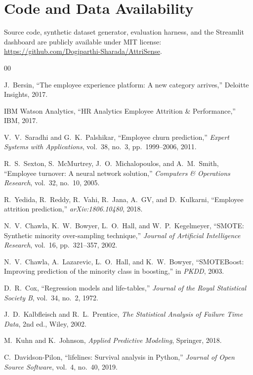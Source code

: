 \documentclass[conference]{IEEEtran}
\begin{document}
\section*{Code and Data Availability}
Source code, synthetic dataset generator, evaluation harness, and
the Streamlit dashboard are publicly available under MIT license:
\url{https://github.com/Dogiparthi-Sharada/AttriSense}.

\begin{thebibliography}{00}

 J.~Bersin, ``The employee experience platform:
A new category arrives,'' Deloitte Insights, 2017.

 IBM Watson Analytics, ``HR Analytics Employee
Attrition \& Performance,'' IBM, 2017.

 V.~V.~Saradhi and G.~K.~Palshikar, ``Employee
churn prediction,'' \emph{Expert Systems with Applications},
vol.~38, no.~3, pp.~1999--2006, 2011.

 R.~S.~Sexton, S.~McMurtrey,
J.~O.~Michalopoulos, and A.~M.~Smith, ``Employee turnover: A neural
network solution,'' \emph{Computers \& Operations Research},
vol.~32, no.~10, 2005.

 R.~Yedida, R.~Reddy, R.~Vahi, R.~Jana,
A.~GV, and D.~Kulkarni, ``Employee attrition prediction,''
\emph{arXiv:1806.10480}, 2018.

 N.~V.~Chawla, K.~W.~Bowyer, L.~O.~Hall, and
W.~P.~Kegelmeyer, ``SMOTE: Synthetic minority over-sampling
technique,'' \emph{Journal of Artificial Intelligence Research},
vol.~16, pp.~321--357, 2002.

 N.~V.~Chawla, A.~Lazarevic, L.~O.~Hall, and
K.~W.~Bowyer, ``SMOTEBoost: Improving prediction of the minority
class in boosting,'' in \emph{PKDD}, 2003.

 D.~R.~Cox, ``Regression models and life-tables,''
\emph{Journal of the Royal Statistical Society B}, vol.~34, no.~2,
1972.

 J.~D.~Kalbfleisch and R.~L.~Prentice,
\emph{The Statistical Analysis of Failure Time Data}, 2nd ed.,
Wiley, 2002.

 M.~Kuhn and K.~Johnson,
\emph{Applied Predictive Modeling}, Springer, 2018.

 C.~Davidson-Pilon, ``lifelines: Survival
analysis in Python,'' \emph{Journal of Open Source Software},
vol.~4, no.~40, 2019.


\end{thebibliography}
\end{document}
